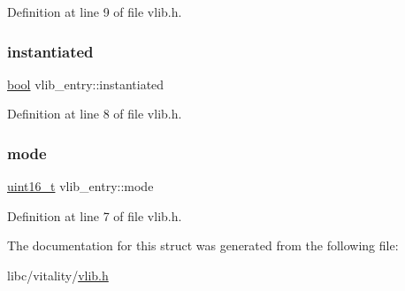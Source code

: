 Definition at line 9 of file vlib.\+h.

\mbox{\label{a00191_ab67e2f60e6622a2d0b7c8a3ac6fd7c71_ab67e2f60e6622a2d0b7c8a3ac6fd7c71}} 
\subsubsection{\texorpdfstring{instantiated}{instantiated}}
{\footnotesize\ttfamily \hyperlink{a00104_af6a258d8f3ee5206d682d799316314b1_af6a258d8f3ee5206d682d799316314b1}{bool} vlib\+\_\+entry\+::instantiated}



Definition at line 8 of file vlib.\+h.

\mbox{\label{a00191_a46df5a47ac05a46ce871e5132153949c_a46df5a47ac05a46ce871e5132153949c}} 
\subsubsection{\texorpdfstring{mode}{mode}}
{\footnotesize\ttfamily \hyperlink{a00104_a273cf69d639a59973b6019625df33e30_a273cf69d639a59973b6019625df33e30}{uint16\+\_\+t} vlib\+\_\+entry\+::mode}



Definition at line 7 of file vlib.\+h.



The documentation for this struct was generated from the following file\+:\begin{DoxyCompactItemize}
\item 
libc/vitality/\hyperlink{a00137}{vlib.\+h}\end{DoxyCompactItemize}
